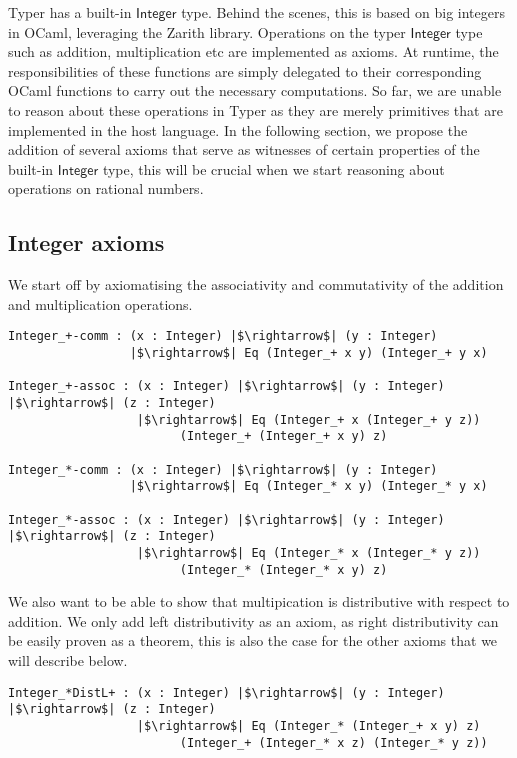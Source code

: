 \documentclass[12pt,twoside,maitrise]{dms}
\theoremstyle{definition}
\numberwithin{equation}{section}
\numberwithin{table}{chapter}
\numberwithin{figure}{chapter}
\newcommand\kw[1] {\textsf{#1}}
\begin{document}
Typer has a built-in $\kw{Integer}$ type. Behind the scenes, this is based on
big integers in OCaml, leveraging the Zarith library. Operations on the typer
$\kw{Integer}$ type such as addition, multiplication etc are implemented as
axioms. At runtime, the responsibilities of these functions are simply delegated
to their corresponding OCaml functions to carry out the necessary computations.
So far, we are unable to reason about these operations in Typer as they are
merely primitives that are implemented in the host language. In the following
section, we propose the addition of several axioms that serve as witnesses of
certain properties of the built-in $\kw{Integer}$ type, this will be crucial
when we start reasoning about operations on rational numbers.

\subsection*{Integer axioms}
We start off by axiomatising the associativity and commutativity of the addition and multiplication operations.

\begin{verbatim}
Integer_+-comm : (x : Integer) |$\rightarrow$| (y : Integer)
                 |$\rightarrow$| Eq (Integer_+ x y) (Integer_+ y x)

Integer_+-assoc : (x : Integer) |$\rightarrow$| (y : Integer) |$\rightarrow$| (z : Integer)
                  |$\rightarrow$| Eq (Integer_+ x (Integer_+ y z))
                        (Integer_+ (Integer_+ x y) z)

Integer_*-comm : (x : Integer) |$\rightarrow$| (y : Integer)
                 |$\rightarrow$| Eq (Integer_* x y) (Integer_* y x)

Integer_*-assoc : (x : Integer) |$\rightarrow$| (y : Integer) |$\rightarrow$| (z : Integer)
                  |$\rightarrow$| Eq (Integer_* x (Integer_* y z))
                        (Integer_* (Integer_* x y) z)
\end{verbatim}

We also want to be able to show that multipication is distributive with respect to addition. We only add left distributivity as an axiom, as right distributivity can be easily proven as a theorem, this is also the case for the other axioms that we will describe below.

\begin{verbatim}
Integer_*DistL+ : (x : Integer) |$\rightarrow$| (y : Integer) |$\rightarrow$| (z : Integer)
                  |$\rightarrow$| Eq (Integer_* (Integer_+ x y) z)
                        (Integer_+ (Integer_* x z) (Integer_* y z))
\end{verbatim}
\end{document}

